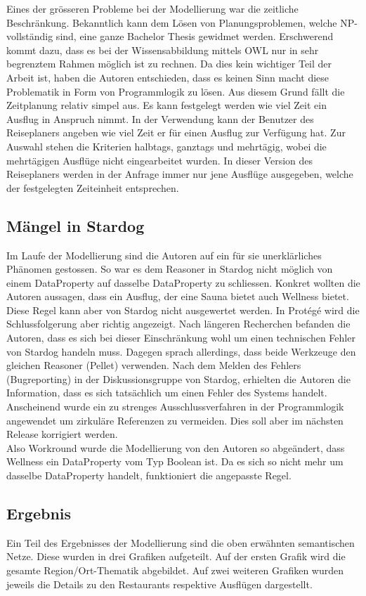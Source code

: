 Eines der grösseren Probleme bei der Modellierung war die zeitliche Beschränkung. Bekanntlich kann dem Lösen von Planungsproblemen, welche NP-vollständig sind, eine ganze Bachelor Thesis gewidmet werden. Erschwerend kommt dazu, dass es bei der Wissensabbildung mittels OWL nur in sehr begrenztem Rahmen möglich ist zu rechnen. Da dies kein wichtiger Teil der Arbeit ist, haben die Autoren entschieden, dass es keinen Sinn macht diese Problematik in Form von Programmlogik zu lösen. Aus diesem Grund fällt die Zeitplanung relativ simpel aus. Es kann festgelegt werden wie viel Zeit ein Ausflug in Anspruch nimmt. In der Verwendung kann der Benutzer des Reiseplaners angeben wie viel Zeit er für einen Ausflug zur Verfügung hat. Zur Auswahl stehen die Kriterien halbtags, ganztags und mehrtägig, wobei die mehrtägigen Ausflüge nicht eingearbeitet wurden. In dieser Version des Reiseplaners werden in der Anfrage immer nur jene Ausflüge ausgegeben, welche der festgelegten Zeiteinheit entsprechen.

\subsection{Mängel in Stardog}
\label{subsec:loesung_modellierung_maengel_stardog}
Im Laufe der Modellierung sind die Autoren auf ein für sie unerklärliches Phänomen gestossen. So war es dem Reasoner in Stardog nicht möglich von einem DataProperty auf dasselbe DataProperty zu schliessen. Konkret wollten die Autoren aussagen, dass ein Ausflug, der eine Sauna bietet auch Wellness bietet. Diese Regel kann aber von Stardog nicht ausgewertet werden. In Protégé wird die Schlussfolgerung aber richtig angezeigt. Nach längeren Recherchen befanden die Autoren, dass es sich bei dieser Einschränkung wohl um einen technischen Fehler von Stardog handeln muss. Dagegen sprach allerdings, dass beide Werkzeuge den gleichen Reasoner (Pellet) verwenden. Nach dem Melden des Fehlers (Bugreporting) in der Diskussionsgruppe von Stardog, erhielten die Autoren die Information, dass es sich tatsächlich um einen Fehler des Systems handelt. Anscheinend wurde ein zu strenges Ausschlussverfahren in der Programmlogik angewendet um zirkuläre Referenzen zu vermeiden. Dies soll aber im nächsten Release korrigiert werden. \\
Also Workround wurde die Modellierung von den Autoren so abgeändert, dass Wellness ein DataProperty vom Typ Boolean ist. Da es sich so nicht mehr um dasselbe DataProperty handelt, funktioniert die angepasste Regel.

\subsection{Ergebnis}
\label{subsec:loesung_modellierung_ergebnis}
Ein Teil des Ergebnisses der Modellierung sind die oben erwähnten semantischen Netze. Diese wurden in drei Grafiken aufgeteilt. Auf der ersten Grafik wird die gesamte Region/Ort-Thematik abgebildet. Auf zwei weiteren Grafiken wurden jeweils die Details zu den Restaurants respektive Ausflügen dargestellt.

